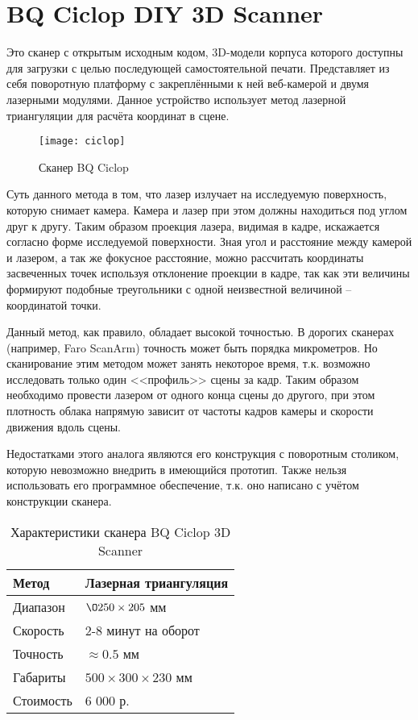     \section{BQ Ciclop DIY 3D Scanner}
        Это сканер с открытым исходным кодом, 3D-модели корпуса которого доступны для загрузки с целью последующей самостоятельной печати\cite{ciclop}. Представляет из себя поворотную платформу с закреплёнными к ней веб-камерой и двумя лазерными модулями. Данное устройство использует метод лазерной триангуляции для расчёта координат в сцене.

        \begin{figure}[!ht]
            \centering
            \texttt{[image: ciclop]}\label{pic:ciclop}
            \caption{Сканер BQ Ciclop}
        \end{figure}

        Суть данного метода в том, что лазер излучает на исследуемую поверхность, которую снимает камера. Камера и лазер при этом должны находиться под углом друг к другу. Таким образом проекция лазера, видимая в кадре, искажается согласно форме исследуемой поверхности. Зная угол и расстояние между камерой и лазером, а так же фокусное расстояние, можно рассчитать координаты засвеченных точек используя отклонение проекции в кадре, так как эти величины формируют подобные треугольники с одной неизвестной величиной -- координатой точки.

        Данный метод, как правило, обладает высокой точностью. В дорогих сканерах (например, Faro ScanArm\cite{faro}) точность может быть порядка микрометров. Но сканирование этим методом может занять некоторое время, т.к. возможно исследовать только один <<профиль>> сцены за кадр. Таким образом необходимо провести лазером от одного конца сцены до другого, при этом плотность облака напрямую зависит от частоты кадров камеры и скорости движения вдоль сцены.

        Недостатками этого аналога являются его конструкция с поворотным столиком, которую невозможно внедрить в имеющийся прототип. Также нельзя использовать его программное обеспечение, т.к. оно написано с учётом конструкции сканера.

        \begin{table}[H]
            \centering
            \caption{Характеристики сканера BQ Ciclop 3D Scanner}\label{table:ciclop}
            \begin{tabular}{|l|l|}\hline
            Метод&Лазерная триангуляция\\ \hline
            Диапазон&$\O250 \times 205$ мм\\ \hline
            Скорость&2-8 минут на оборот\\ \hline
            Точность&$\approx 0.5$ мм\\ \hline
            Габариты&$ 500 \times 300 \times 230 $ мм\\ \hline
            Стоимость&6 000 р.\\ \hline
            \end{tabular}
        \end{table}

